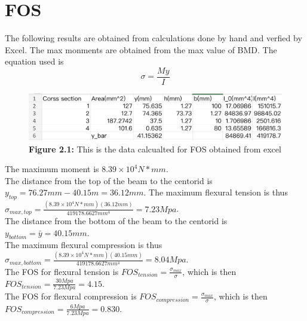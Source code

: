 \documentclass[12pt,titlepage,a4paper]{article}
\begin{document}
    \section{FOS}
        The following results are obtained from calculations done by hand and verfied by Excel. 
        The max monments are obtained from the max value of BMD. The equation used is
        \begin{equation}
            \sigma = \frac{My}{I}
        \end{equation}
        \begin{figure}[H]
            \centering
            \includegraphics[width=13cm]{m_and_centorid.png}
            \caption*{\textbf{Figure 2.1:} This is the data calcualted for FOS obtained from excel}
            \label{fig:enter-label}
        \end{figure}
        \begin{spacing}{1.5}
        The maximum moment is $8.39\times10^4 N*mm$. \\The distance from the top of the beam to the centorid is 
        $y_{top} = 76.27mm - 40.15m = 36.12mm$. The maximum flexural tension is thus $\sigma_{max, top} = \frac{(8.39\times10^4 N*mm)
        (36.12mm)}{419178.6627mm^4} = 7.23Mpa$. \\The distance from the bottom of the beam to the centorid is 
        $y_{bottom} = \bar{y} = 40.15mm$. 
        \\The maximum flexural compression is thus $\sigma_{max, bottom} = \frac{(8.39\times10^4 N*mm)
        (40.15mm)}{419178.6627mm^4} = 8.04Mpa$. 
        \\The FOS for flexural tension is $FOS_{tension} = \frac{\sigma_{max}}{\sigma}$, which is then $FOS_{tension} = \frac{30Mpa}{7.23Mpa} = 4.15$.
        \\The FOS for flexural compression is $FOS_{compression} = \frac{\sigma_{max}}{\sigma}$, which is then $FOS_{compression} = \frac{6Mpa}{7.23Mpa} = 0.830$.
        \end{spacing}
\end{document}
